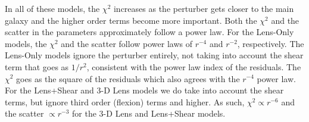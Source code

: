In all of these models, the $\chi^2$ increases as the perturber gets closer to the main galaxy and the higher order terms become more important. Both the $\chi^2$ and the scatter in the parameters approximately follow a power law. For the Lens-Only models, the $\chi^2$ and the scatter follow power laws of $r^{-4}$ and $r^{-2}$, respectively. The Lens-Only models ignore the perturber entirely, not taking into account the shear term that goes as $1/r^2$, consistent with the power law index of the residuals. The $\chi^2$ goes as the square of the residuals which also agrees with the $r^{-4}$ power law. For the Lens+Shear and 3-D Lens models we do take into account the shear terms, but ignore third order (flexion) terms and higher. As such, $\chi^2 \propto r^{-6}$ and the scatter $\propto r^{-3}$ for the 3-D Lens and Lens+Shear models.